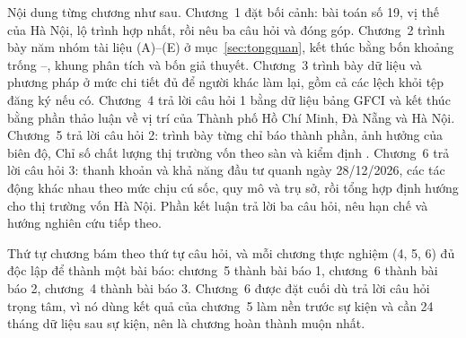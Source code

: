 Nội dung từng chương như sau. Chương~1 đặt bối cảnh: bài toán số 19, vị thế của Hà Nội, lộ trình hợp nhất, rồi nêu ba câu hỏi và đóng góp. Chương~2 trình bày năm nhóm tài liệu (A)--(E) ở mục~\ref{sec:tongquan}, kết thúc bằng bốn khoảng trống --, khung phân tích và bốn giả thuyết. Chương~3 trình bày dữ liệu và phương pháp ở mức chi tiết đủ để người khác làm lại, gồm cả các lệch khỏi tệp đăng ký nếu có. Chương~4 trả lời câu hỏi 1 bằng dữ liệu bảng GFCI và kết thúc bằng phần thảo luận về vị trí của Thành phố Hồ Chí Minh, Đà Nẵng và Hà Nội. Chương~5 trả lời câu hỏi 2: trình bày từng chỉ báo thành phần, ảnh hưởng của biên độ, Chỉ số chất lượng thị trường vốn theo sàn và kiểm định . Chương~6 trả lời câu hỏi 3: thanh khoản và khả năng đầu tư quanh ngày 28/12/2026, các tác động khác nhau theo mức chịu cú sốc, quy mô và trụ sở, rồi tổng hợp định hướng cho thị trường vốn Hà Nội. Phần kết luận trả lời ba câu hỏi, nêu hạn chế và hướng nghiên cứu tiếp theo.


Thứ tự chương bám theo thứ tự câu hỏi, và mỗi chương thực nghiệm (4, 5, 6) đủ độc lập để thành một bài báo: chương~5 thành bài báo 1, chương~6 thành bài báo 2, chương~4 thành bài báo 3. Chương~6 được đặt cuối dù trả lời câu hỏi trọng tâm, vì nó dùng kết quả của chương~5 làm nền trước sự kiện và cần 24 tháng dữ liệu sau sự kiện, nên là chương hoàn thành muộn nhất.
